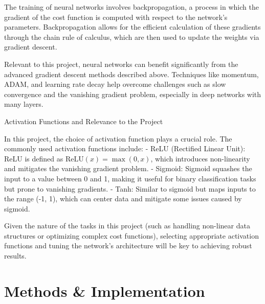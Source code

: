 \documentclass[aps,pra,english,notitlepage,reprint,nofootinbib]{revtex4-1}  %
\begin{document}
The training of neural networks involves backpropagation, a process in which the gradient of the cost function is computed with respect to the network's parameters. Backpropagation allows for the efficient calculation of these gradients through the chain rule of calculus, which are then used to update the weights via gradient descent.

Relevant to this project, neural networks can benefit significantly from the advanced gradient descent methods described above. Techniques like momentum, ADAM, and learning rate decay help overcome challenges such as slow convergence and the vanishing gradient problem, especially in deep networks with many layers.

Activation Functions and Relevance to the Project

In this project, the choice of activation function plays a crucial role. The commonly used activation functions include:
- ReLU (Rectified Linear Unit): ReLU is defined as \( \text{ReLU}(x) = \max(0, x) \), which introduces non-linearity and mitigates the vanishing gradient problem.
- Sigmoid: Sigmoid squashes the input to a value between 0 and 1, making it useful for binary classification tasks but prone to vanishing gradients.
- Tanh: Similar to sigmoid but maps inputs to the range (-1, 1), which can center data and mitigate some issues caused by sigmoid.

Given the nature of the tasks in this project (such as handling non-linear data structures or optimizing complex cost functions), selecting appropriate activation functions and tuning the network's architecture will be key to achieving robust results.
\color{black}


\section{Methods \& Implementation}\label{sec:methods}
\end{document}
